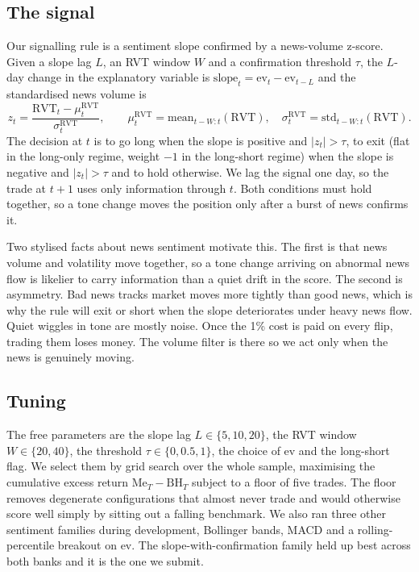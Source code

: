 \documentclass[12pt,a4paper]{article}
\newcommand{\Me}{\mathrm{Me}}
\newcommand{\BH}{\mathrm{BH}}
\newcommand{\ev}{\mathrm{ev}}
\begin{document}
\subsection{The signal}
Our signalling rule is a sentiment slope confirmed by a news-volume z-score.
Given a slope lag $L$, an RVT window $W$ and a confirmation threshold $\tau$,
the $L$-day change in the explanatory variable is
$\mathrm{slope}_t = \ev_t - \ev_{t-L}$ and the standardised news volume is
\[
z_t = \frac{\mathrm{RVT}_t - \mu^{\mathrm{RVT}}_t}{\sigma^{\mathrm{RVT}}_t},
\qquad
\mu^{\mathrm{RVT}}_t = \mathrm{mean}_{t-W:t}(\mathrm{RVT}),\quad
\sigma^{\mathrm{RVT}}_t = \mathrm{std}_{t-W:t}(\mathrm{RVT}).
\]
The decision at $t$ is to go long when the slope is positive and $|z_t|>\tau$,
to exit (flat in the long-only regime, weight $-1$ in the long-short regime)
when the slope is negative and $|z_t|>\tau$ and to hold otherwise. We lag the
signal one day, so the trade at $t+1$ uses only information through $t$. Both
conditions must hold together, so a tone change moves the position only after a
burst of news confirms it.

Two stylised facts about news sentiment motivate this. The first is that news
volume and volatility move together, so a tone change arriving on abnormal news
flow is likelier to carry information than a quiet drift in the score. The
second is asymmetry. Bad news tracks market moves more tightly than good news,
which is why the rule will exit or short when the slope deteriorates under heavy
news flow. Quiet wiggles in tone are mostly noise. Once the 1\% cost is paid on
every flip, trading them loses money. The volume filter is there so we act only
when the news is genuinely moving.

\subsection{Tuning}
The free parameters are the slope lag $L\in\{5,10,20\}$, the RVT window
$W\in\{20,40\}$, the threshold $\tau\in\{0,0.5,1\}$, the choice of $\ev$ and the
long-short flag. We select them by grid search over the whole sample,
maximising the cumulative excess return $\Me_T-\BH_T$ subject to a floor of
five trades. The floor removes degenerate configurations that almost never trade
and would otherwise score well simply by sitting out a falling benchmark. We also ran three other sentiment families during development,
Bollinger bands, MACD and a rolling-percentile breakout on $\ev$. The
slope-with-confirmation family held up best across both banks and it is the
one we submit.
\end{document}
